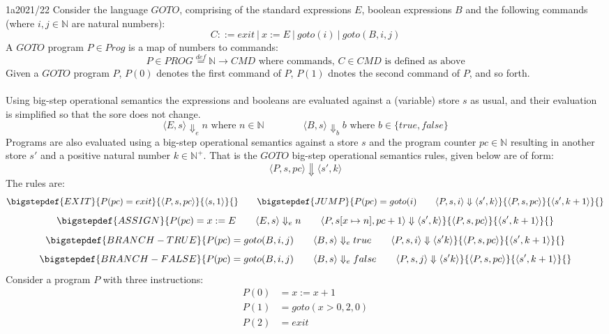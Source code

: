 \begin{exambox}{1a}{2021/22}
	Consider the language $GOTO$, comprising of the standard expressions $E$, boolean expressions $B$ and the following commands (where $i,j \in \mathbb{N}$ are natural numbers):
	\[C ::= exit \ | \ x := E \ | \ goto(i) \ | \ goto(B, i, j)\]
	A $GOTO$ program $P \in Prog$ is a map of numbers to commands:
	\[P \in PROG \overset{def}{=} \mathbb{N} \to CMD \text{ where commands, } C \in CMD \text{ is defined as above}\] 
	Given a $GOTO$ program $P$, $P(0)$ denotes the first command of $P$, $P(1)$ dnotes the second command of $P$, and so forth.
	\\
	\\ Using big-step operational semantics the expressions and booleans are evaluated against a (variable) store $s$ as usual, and their evaluation is simplified so that the sore does not change.
	\[\langle E, s \rangle \Downarrow_e n \text{ where } n \in \mathbb{N} \qquad \qquad \langle B, s \rangle \Downarrow_b b \text{ where } b \in \{true, false\}\]
	Programs are also evaluated using a big-step operational semantics against a store $s$ and the program counter $pc \in \mathbb{N}$ resulting in another store $s'$ and a positive natural number $k \in \mathbb{N}^+$. That is the $GOTO$ big-step operational semantics rules, given below are of form:
	\[\langle P, s, pc \rangle \Downarrow \langle s', k \rangle\]
	The rules are:
	\[\bigstepdef{EXIT}{P(pc) = exit}{\langle P, s, pc \rangle}{\langle s, 1 \rangle}{} \qquad \bigstepdef{JUMP}{P(pc) = goto(i) \qquad \langle P, s, i \rangle \Downarrow \langle s', k \rangle}{\langle P, s, pc \rangle}{\langle s', k+1 \rangle}{}\]
	\[\bigstepdef{ASSIGN}{P(pc) = x := E \qquad \langle E, s \rangle \Downarrow_e n \qquad \langle P, s[x \mapsto n], pc + 1 \rangle \Downarrow \langle s', k \rangle}{\langle P, s, pc \rangle}{\langle s', k+1 \rangle}{}\]
	\[\bigstepdef{BRANCH-TRUE}{P(pc) = goto(B, i, j) \qquad \langle B, s \rangle \Downarrow_e true \qquad \langle P, s, i \rangle \Downarrow \langle s' k \rangle}{\langle P, s, pc \rangle}{\langle s', k+1 \rangle}{}\]
	\[\bigstepdef{BRANCH-FALSE}{P(pc) = goto(B, i, j) \qquad \langle B, s \rangle \Downarrow_e false \qquad \langle P, s, j \rangle \Downarrow \langle s' k \rangle}{\langle P, s, pc \rangle}{\langle s', k+1 \rangle}{}\]
	Consider a program $P$ with three instructions:
	\[\begin{split}
		P(0) & = x:= x + 1 \\
		P(1) & = goto(x>0, 2, 0) \\
		P(2) & = exit \\

\end{split}\]
\end{exambox}
